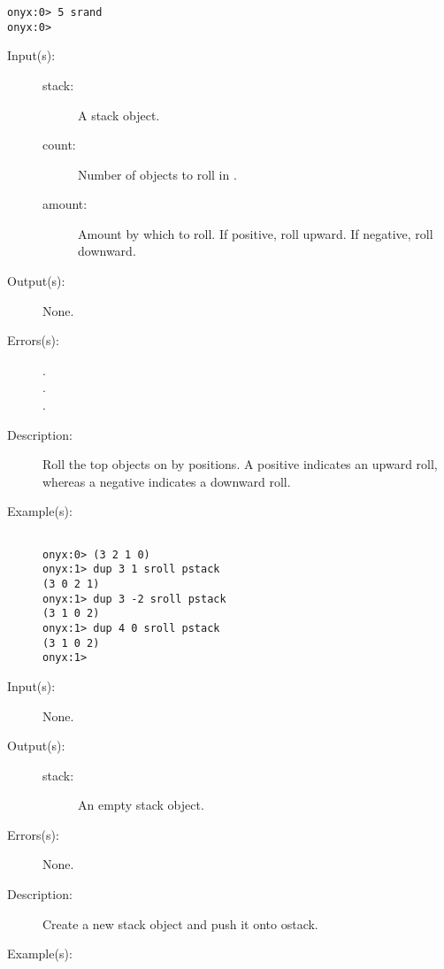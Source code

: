 \begin{description}
\begin{description}
\begin{verbatim}
onyx:0> 5 srand
onyx:0>
		\end{verbatim}
	\end{description}
\label{systemdict:sroll}
\item[{\onyxop{stack count amount}{sroll}{--}}: ]
	\begin{description}\item[]
	\item[Input(s): ]
		\begin{description}\item[]
		\item[stack: ]
			A stack object.
		\item[count: ]
			Number of objects to roll in .
		\item[amount: ]
			Amount by which to roll.  If positive, roll
			upward.  If negative, roll downward.
		\end{description}
	\item[Output(s): ] None.
	\item[Errors(s): ]
		\begin{description}\item[]
		\item[.]
		\item[.]
		\item[.]
		\end{description}
	\item[Description: ]
		Roll the top  objects on  by
		 positions.  A positive 
		indicates an upward roll, whereas a negative 
		indicates a downward roll.
	\item[Example(s): ]\begin{verbatim}

onyx:0> (3 2 1 0)
onyx:1> dup 3 1 sroll pstack
(3 0 2 1)
onyx:1> dup 3 -2 sroll pstack
(3 1 0 2)
onyx:1> dup 4 0 sroll pstack
(3 1 0 2)
onyx:1>
		\end{verbatim}
	\end{description}
\label{systemdict:stack}
\item[{\onyxop{--}{stack}{stack}}: ]
	\begin{description}\item[]
	\item[Input(s): ] None.
	\item[Output(s): ]
		\begin{description}\item[]
		\item[stack: ]
			An empty stack object.
		\end{description}
	\item[Errors(s): ] None.
	\item[Description: ]
		Create a new stack object and push it onto ostack.
	\item[Example(s): ]\begin{verbatim}


\end{verbatim}
\end{description}
\end{description}
